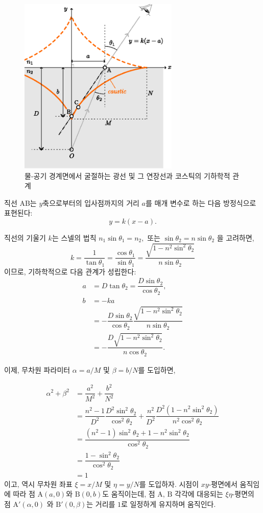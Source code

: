 \documentclass[twocolumn]{article}
\begin{document}
\begin{figure}
	\centering
	\includegraphics[width=3in]{figs/g237.eps}
	\caption{물-공기 경계면에서 굴절하는 광선 및 그 연장선과 코스틱의 기하학적 관계}
	\label{fig:geometry}
\end{figure}

 직선 AB는 $y$축으로부터의 입사점까지의 거리 $a$를 매개 변수로 하는 다음 방정식으로 표현된다:
$$y=k(x-a).$$

직선의 기울기 $k$는 스넬의 법칙
$ {n_1}\sin\theta_1 ={n_2},$ 또는 $ \sin\theta_2 = n\sin\theta_2$
을 고려하면,
$$k=\dfrac{1}{\tan\theta_1}=\dfrac{\cos\theta_1}{\sin\theta_1}
	=\dfrac{\sqrt{1-n^2\sin^2\theta_2}}{n\sin\theta_2}$$
이므로,
기하학적으로 다음 관계가 성립한다:
$$\begin{aligned}
	a &= D\tan\theta_2 = \dfrac{D\sin\theta_2}{\cos\theta_2},\\
	b &= -ka \\
	&= -\dfrac{D\sin\theta_2}{\cos\theta_2}
	\dfrac{\sqrt{1-n^2\sin^2\theta_2}}{n\sin\theta_2}\\
	&=-\dfrac{D\sqrt{1-n^2\sin^2\theta_2}}{n\cos\theta_2}.
\end{aligned}$$

이제, 무차원 파라미터 $\alpha=a/M$ 및 $\beta=b/N$를 도입하면,

$$ \begin{aligned}
	\alpha^2 + \beta^2 &= \dfrac{a^2}{M^2}+\dfrac{b^2}{N^2}\\
	&=\dfrac{n^2-1}{D^2}\dfrac{D^2\sin^2\theta_2}{\cos^2\theta_2}%
	+\dfrac{n^2}{D^2}\dfrac{D^2(1-n^2\sin^2\theta_2)}{n^2\cos^2\theta_2}\\
	&=\dfrac{\left(n^2-1\right)\sin^2\theta_2 + 1-n^2\sin^2\theta_2}
	{\cos^2\theta_2}\\
	&=\dfrac{1-\sin^2\theta_2}{\cos^2\theta_2}\\
	&= 1
\end{aligned}$$
%
이고, 역시 무차원 좌표 $\xi=x/M$ 및 $\eta=y/N$를 도입하자. 시점이 $xy$-평면에서 움직임에 따라 점 $\mathrm{A}(a, 0)$와 $\mathrm{B}(0, b)$도 움직이는데, 점 $\mathrm{A}$, $\mathrm{B}$ 각각에 대응되는  $\xi\eta$-평면의 점 $\mathrm{A'}(\alpha, 0)$
와 $\mathrm{B'}(0, \beta)$는 거리를 $1$로 일정하게 유지하며 움직인다.
\end{document}
